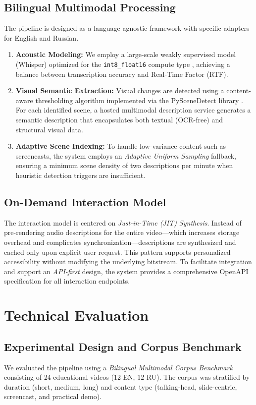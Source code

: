 \documentclass[conference]{IEEEtran}
\begin{document}
\subsection{Bilingual Multimodal Processing}
The pipeline is designed as a language-agnostic framework with specific adapters for English and Russian.
\begin{enumerate}
\item \textbf{Acoustic Modeling:} We employ a large-scale weakly supervised model (Whisper) optimized for the \texttt{int8\_float16} compute type \cite{Radford2022}, achieving a balance between transcription accuracy and Real-Time Factor (RTF).
\item \textbf{Visual Semantic Extraction:} Visual changes are detected using a content-aware thresholding algorithm implemented via the PySceneDetect library \cite{PySceneDetect}. For each identified scene, a hosted multimodal description service generates a semantic description that encapsulates both textual (OCR-free) and structural visual data.
\item \textbf{Adaptive Scene Indexing:} To handle low-variance content such as screencasts, the system employs an \emph{Adaptive Uniform Sampling} fallback, ensuring a minimum scene density of two descriptions per minute when heuristic detection triggers are insufficient.
\end{enumerate}

\subsection{On-Demand Interaction Model}
The interaction model is centered on \emph{Just-in-Time (JIT) Synthesis}. Instead of pre-rendering audio descriptions for the entire video—which increases storage overhead and complicates synchronization—descriptions are synthesized and cached only upon explicit user request. This pattern supports personalized accessibility without modifying the underlying bitstream. To facilitate integration and support an \emph{API-first} design, the system provides a comprehensive OpenAPI specification for all interaction endpoints.

\section{Technical Evaluation}
\subsection{Experimental Design and Corpus Benchmark}
We evaluated the pipeline using a \emph{Bilingual Multimodal Corpus Benchmark} consisting of 24 educational videos (12 EN, 12 RU). The corpus was stratified by duration (short, medium, long) and content type (talking-head, slide-centric, screencast, and practical demo). 
\end{document}
